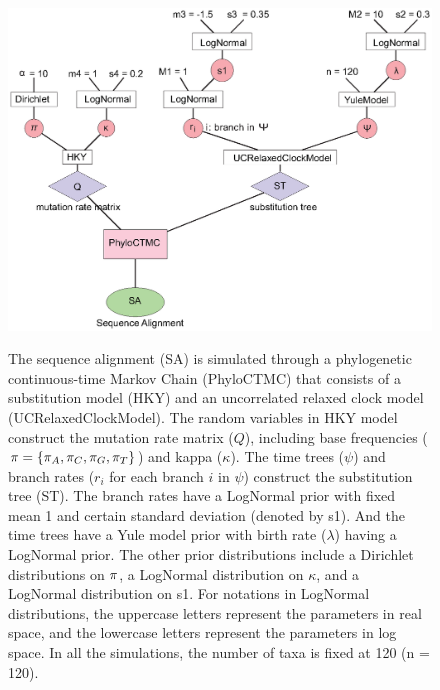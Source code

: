 \documentclass{bmcart}
\newcommand{\alexei}[1]{{\textcolor{cyan} {Alexei says: #1} }}
\begin{document}
\begin{backmatter}
\begin{figure}[h!]
\includegraphics[width=12cm]{Fig08-modelvalidation.eps}\\
\caption{
             The sequence alignment (SA) is simulated through a phylogenetic continuous-time Markov Chain (PhyloCTMC) that consists of a substitution model (HKY) and an uncorrelated relaxed clock model (UCRelaxedClockModel). The random variables in HKY model construct the mutation rate matrix ($Q$), including base frequencies (${\bf{\pi}} = \{{\pi_A}, {\pi_C}, {\pi_G}, {\pi_T}\}$) and kappa ($\kappa$). The time trees ($\psi$) and branch rates ($r_i$ for each branch $i$ in $\psi$) construct the substitution tree (ST). The branch rates have a LogNormal prior with fixed mean 1 and certain standard deviation (denoted by s1). And the time trees have a Yule model prior with birth rate ($\lambda$) having a LogNormal prior. The other prior distributions include a Dirichlet distributions on ${\bf{\pi}}$, a LogNormal distribution on $\kappa$, and a LogNormal distribution on s1. For notations in LogNormal distributions, the uppercase letters represent the parameters in real space, and the lowercase letters represent the parameters in log space. In all the simulations, the number of taxa is fixed at 120 (n = 120).}
\label{modelvalidation}
\end{figure}


\end{backmatter}
\end{document}
